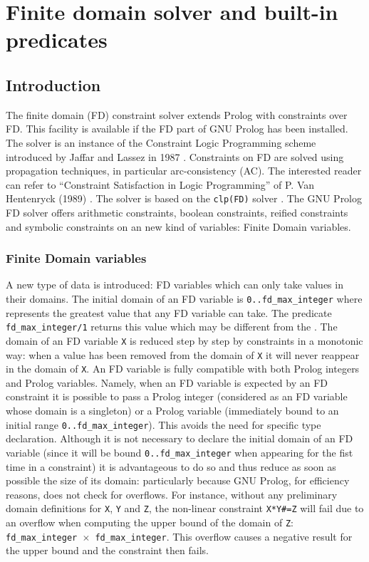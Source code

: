 \newpage
\section{Finite domain solver and built-in predicates}
\subsection{Introduction}
\label{Intro-FD}
The finite domain (FD) constraint solver extends Prolog with constraints over
FD. This facility is available if the FD part of GNU Prolog has been
installed.  The solver is an instance of the Constraint Logic Programming
scheme introduced by Jaffar and Lassez in 1987
\cite{Jaffar-Lassez87}. Constraints on FD are solved using propagation
techniques, in particular arc-consistency (AC). The interested reader can
refer to ``Constraint Satisfaction in Logic Programming'' of P. Van
Hentenryck (1989) \cite{pvh89}. The solver is based on the \texttt{clp(FD)}
solver \cite{long-clp-fd}. The GNU Prolog FD solver offers arithmetic
constraints, boolean constraints, reified constraints and symbolic
constraints on an new kind of variables: Finite Domain variables.

\subsubsection{Finite Domain variables}
\label{Finite-Domain-variables}
A new type of data is introduced: FD variables which can only take values in
their domains. The initial domain of an FD variable is
\texttt{0..fd\_max\_integer} where  represents the
greatest value that any FD variable can take. The predicate
\texttt{fd\_max\_integer/1} returns this value which may be different from
the  
. The domain of an FD variable \texttt{X} is
reduced step by step by constraints in a monotonic way: when a value
has been removed from the domain of \texttt{X} it will never reappear
in the domain of \texttt{X}. An FD variable is fully compatible with
both Prolog integers and Prolog variables.  Namely, when an FD
variable is expected by an FD constraint it is possible to pass a
Prolog integer (considered as an FD variable whose domain is a
singleton) or a Prolog variable (immediately bound to an initial range
\texttt{0..fd\_max\_integer}). This avoids the need for specific type
declaration. Although it is not necessary to declare the initial domain of an
FD variable (since it will be bound \texttt{0..fd\_max\_integer} when
appearing for the fist time in a constraint) it is advantageous to do so and
thus reduce as soon as possible the size of its domain: particularly because
GNU Prolog, for efficiency reasons, does not check for overflows. For instance,
without any preliminary domain definitions for \texttt{X}, \texttt{Y} and
\texttt{Z}, the non-linear constraint \texttt{X*Y\#=Z} will fail due to an
overflow when computing the upper bound of the domain of \texttt{Z}:
\texttt{fd\_max\_integer $\times$ fd\_max\_integer}. This overflow causes a
negative result for the upper bound and the constraint then fails.

